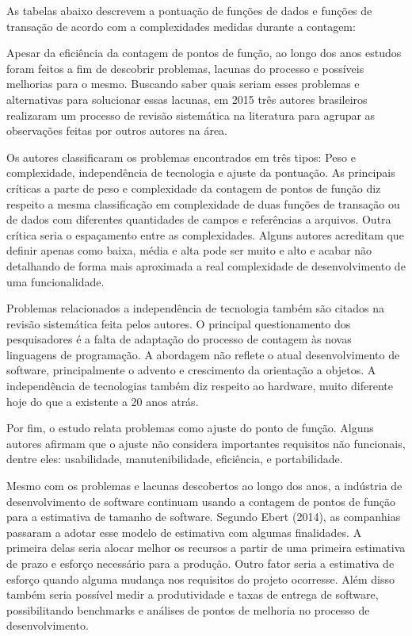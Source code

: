 As tabelas abaixo descrevem a pontuação de funções de dados e funções de transação de acordo com a complexidades medidas durante a contagem:





Apesar da eficiência da contagem de pontos de função, ao longo dos anos estudos foram feitos a fim de descobrir problemas, lacunas do processo e possíveis melhorias para o mesmo. Buscando saber quais seriam esses problemas e alternativas para solucionar essas lacunas, em 2015 três autores brasileiros realizaram um processo de revisão sistemática na literatura para agrupar as observações feitas por outros autores na área.

Os autores classificaram os problemas encontrados em três tipos: Peso e complexidade, independência de tecnologia e ajuste da pontuação. As principais críticas a parte de peso e complexidade da contagem de pontos de função diz respeito a mesma classificação em complexidade de duas funções de transação ou de dados com diferentes quantidades de campos e referências a arquivos. Outra crítica seria o espaçamento entre as complexidades. Alguns autores acreditam que definir apenas como baixa, média e alta pode ser muito e alto e acabar não detalhando de forma mais aproximada a real complexidade de desenvolvimento de uma funcionalidade.

Problemas relacionados a independência de tecnologia também são citados na revisão sistemática feita pelos autores. O principal questionamento dos pesquisadores é a falta de adaptação do processo de contagem às novas linguagens de programação. A abordagem não reflete o atual desenvolvimento de software, principalmente o advento e crescimento da orientação a objetos. A independência de tecnologias também diz respeito ao hardware, muito diferente hoje do que a existente a 20 anos atrás.

Por fim, o estudo relata problemas como ajuste do ponto de função. Alguns autores afirmam que o ajuste não considera  importantes requisitos não funcionais, dentre eles: usabilidade, manutenibilidade, eficiência, e portabilidade.

Mesmo com os problemas e lacunas descobertos ao longo dos anos, a indústria de desenvolvimento de software continuam usando a contagem de pontos de função para a estimativa de tamanho de software. Segundo Ebert (2014), as companhias passaram a adotar esse modelo de estimativa com algumas finalidades. A primeira delas seria alocar melhor os recursos a partir de uma primeira estimativa de prazo e esforço necessário para a produção. Outro fator seria a estimativa de esforço quando alguma mudança nos requisitos do projeto ocorresse. Além disso também seria possível medir a produtividade e taxas de entrega de software, possibilitando benchmarks  e análises de pontos de melhoria no processo de desenvolvimento.


